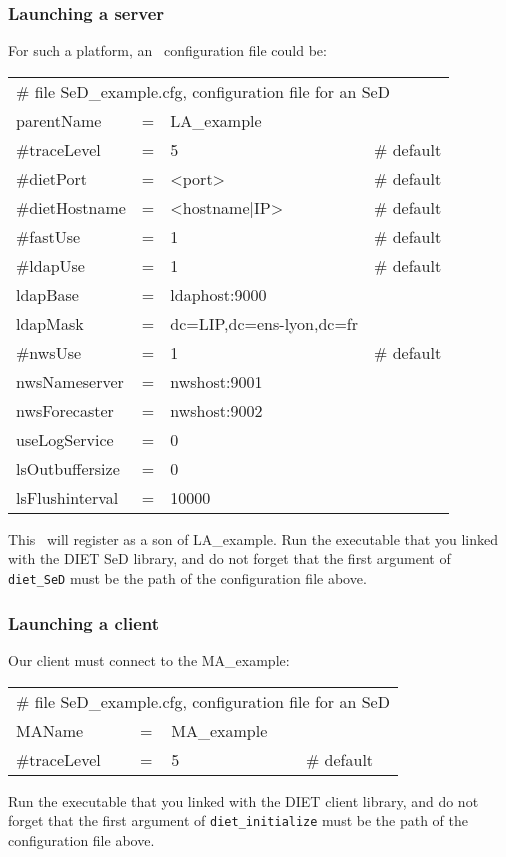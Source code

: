 \subsubsection{Launching a server}

For such a platform, an \sed\ configuration file could be:
\tt
\begin{center}
 \footnotesize
 \begin{tabular}{lcll}
  \multicolumn{4}{l}{\# file SeD\_example.cfg, configuration file for an SeD}\\
  parentName   &=&LA\_example        &\\
  \#traceLevel &=&5                 &\# default\\
  \#dietPort    &=&<port>             &\# default\\
  \#dietHostname&=&<hostname|IP>      &\# default\\
  \#fastUse    &=&1                 &\# default\\
  \#ldapUse    &=&1                 &\# default\\
  ldapBase     &=&ldaphost:9000     &\\
  ldapMask     &=&dc=LIP,dc=ens-lyon,dc=fr&\\
  \#nwsUse     &=&1                 &\# default\\
  nwsNameserver&=&nwshost:9001      &\\
  nwsForecaster&=&nwshost:9002      &\\
  useLogService &=& 0                 &\\
  lsOutbuffersize &=& 0               &\\
  lsFlushinterval &=& 10000           &\\
 \end{tabular}
\end{center}
\rm

This \sed\ will register as a son of LA\_example. Run the executable
that you linked with the DIET SeD library, and do not forget that the
first argument of \texttt{diet\_SeD} must be the path of the
configuration file above.


\subsubsection{Launching a client}

Our client must connect to the MA\_example:
\tt
\begin{center}
 \footnotesize
 \begin{tabular}{lcll}
  \multicolumn{4}{l}{\# file SeD\_example.cfg, configuration file for an SeD}\\
  MAName       &=&MA\_example        &\\
  \#traceLevel &=&5                 &\# default\\
 \end{tabular}
\end{center}
\rm

Run the executable that you linked with the DIET client library, and
do not forget that the first argument of \texttt{diet\_initialize}
must be the path of the configuration file above.

